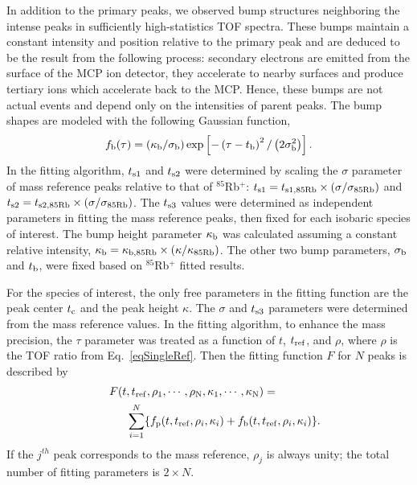 \documentclass[3p]{elsarticle}
\begin{document}
In addition to the primary peaks, we observed bump structures neighboring the intense peaks in sufficiently high-statistics TOF spectra. These bumps maintain a constant intensity and position relative to the primary peak and are deduced to be the result from the following process: secondary electrons are emitted from the surface of the MCP ion detector, they accelerate to nearby surfaces and produce tertiary ions which accelerate back to the MCP. Hence, these bumps are not actual events and depend only on the intensities of parent peaks. The bump shapes are modeled with the following Gaussian function,
\begin{equation}
f_{\rm b}(\tau) = \left( \kappa_{\rm b} / \sigma_{\rm b} \right) \exp \left[ - \left(\tau -t_{\rm b} \right)^2 / \left(2\sigma_{\rm b}^2 \right) \right].
\end{equation} 
In the fitting algorithm, $t_{\rm s1}$ and $t_{\rm s2}$ were determined by scaling the $\sigma$ parameter of mass reference peaks relative to that of $^{85}$Rb$^+$: $t_{\rm s1} = t_{\rm s1,85Rb} \times (\sigma/\sigma_{\rm 85Rb})$ and $t_{\rm s2} = t_{\rm s2,85Rb} \times (\sigma/\sigma_{\rm 85Rb})$. The $t_{\rm s3}$ values were determined as independent parameters in fitting the mass reference peaks, then fixed for each isobaric species of interest. The bump height parameter $\kappa_{\rm b}$ was calculated assuming a constant relative intensity, $\kappa_{\rm b} = \kappa_{\rm b, 85Rb} \times (\kappa/\kappa_{\rm 85Rb})$.  The other two bump parameters, $\sigma_{\rm b}$ and $t_{\rm b}$, were fixed based on $^{85}$Rb$^+$ fitted results.
 
For the species of interest, the only free parameters in the fitting function are the peak center $t_{\rm c}$ and the peak height $\kappa$. The $\sigma$ and $t_{\rm s3}$ parameters were determined from the mass reference values.  In the fitting algorithm, to enhance the mass precision, the $\tau$ parameter was treated as a function of $t$, $t_{\rm ref}$, and $\rho$, where $\rho$ is the TOF ratio from Eq.~\ref{eqSingleRef}. Then the fitting function $F$ for $N$ peaks is described by 
 \begin{align}
&&F(t, t_{\rm ref}, \rho_1, \cdots, \rho_{\rm N},\kappa_1, \cdots, \kappa_{\rm N}) = \hspace{4em} \nonumber  \\
&&\sum_{i=1}^{N} \{ f_{\rm p} (t, t_{\rm ref}, \rho_i,\kappa_i) + f_{\rm b} (t, t_{\rm ref}, \rho_i,\kappa_i)\}.
\end{align}
If the $j^{th}$ peak corresponds to the mass reference, $\rho_j$ is always unity; the total number of fitting parameters is $2 \times N$.
\end{document}
